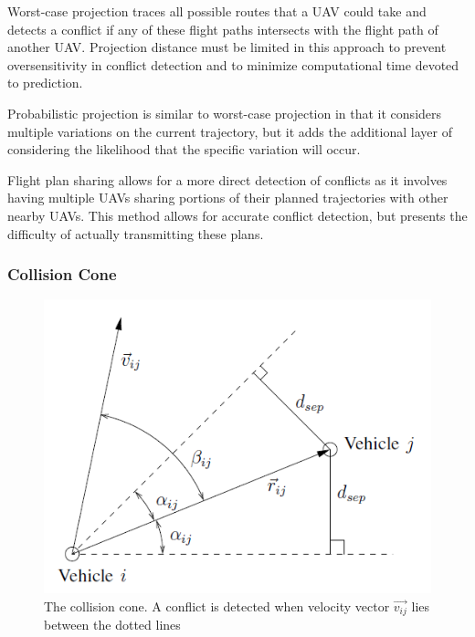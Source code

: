 \documentclass[conference]{IEEEtran}
\begin{document}
Worst-case projection traces all possible routes that a UAV could take and detects a conflict if any of these flight paths intersects with the flight path of another UAV.  Projection distance must be limited in this approach to prevent oversensitivity in conflict detection and to minimize computational time devoted to prediction.

Probabilistic projection is similar to worst-case projection in that it considers multiple variations on the current trajectory, but it adds the additional layer of considering the likelihood that the specific variation will occur.  

Flight plan sharing allows for a more direct detection of conflicts as it involves having multiple UAVs sharing portions of their planned trajectories with other nearby UAVs.  This method allows for accurate conflict detection, but presents the difficulty of actually transmitting these plans.  

\subsubsection{Collision Cone}

\begin{figure}[h]
	\includegraphics [width=1\columnwidth] {2008Kristi}
	\caption{The collision cone. A conflict is detected when velocity vector \begin{math}\vec{v_{ij}}\end{math} lies between the dotted lines \cite{lalish2008decentralized}}
	\label{fig:cone}
\end{figure}
\end{document}
